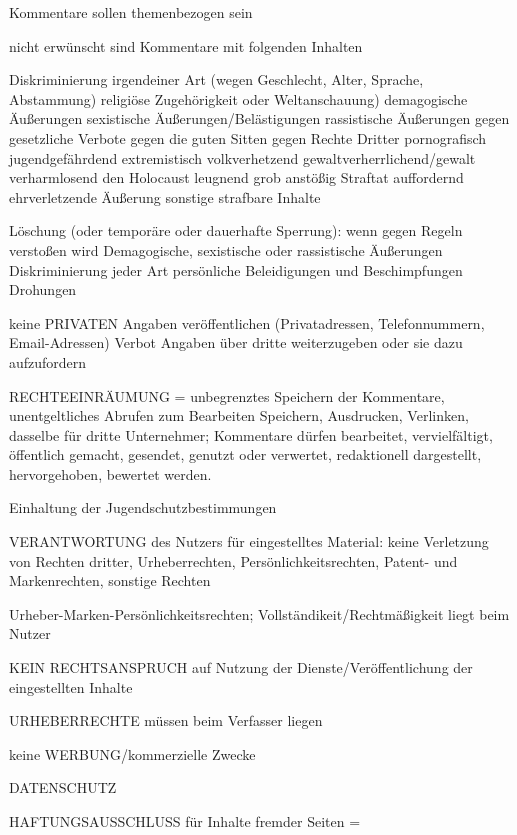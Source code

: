 Kommentare sollen themenbezogen sein

nicht erwünscht sind Kommentare mit folgenden Inhalten

Diskriminierung irgendeiner Art (wegen Geschlecht, Alter, Sprache, Abstammung) religiöse Zugehörigkeit oder Weltanschauung)
demagogische Äußerungen
sexistische Äußerungen/Belästigungen
rassistische Äußerungen 
gegen gesetzliche Verbote
gegen die guten Sitten 
gegen Rechte Dritter
pornografisch
jugendgefährdend
extremistisch
volkverhetzend
gewaltverherrlichend/gewalt verharmlosend
den Holocaust leugnend
grob anstößig
Straftat auffordernd 
ehrverletzende Äußerung
sonstige strafbare Inhalte


Löschung (oder temporäre oder dauerhafte Sperrung): wenn gegen Regeln verstoßen wird
Demagogische, sexistische oder rassistische Äußerungen
Diskriminierung jeder Art
persönliche Beleidigungen und Beschimpfungen
Drohungen

keine PRIVATEN Angaben veröffentlichen (Privatadressen, Telefonnummern, Email-Adressen)
Verbot Angaben über dritte weiterzugeben oder sie dazu aufzufordern

RECHTEEINRÄUMUNG =
unbegrenztes Speichern der Kommentare, unentgeltliches Abrufen zum Bearbeiten Speichern, Ausdrucken, Verlinken, dasselbe für dritte Unternehmer; Kommentare dürfen bearbeitet, vervielfältigt, öffentlich gemacht, gesendet, genutzt oder verwertet, redaktionell dargestellt, hervorgehoben, bewertet werden.


Einhaltung der Jugendschutzbestimmungen

VERANTWORTUNG des Nutzers für eingestelltes Material: 
keine Verletzung von Rechten dritter, Urheberrechten, Persönlichkeitsrechten, Patent- und Markenrechten, sonstige Rechten

Urheber-Marken-Persönlichkeitsrechten; Vollständikeit/Rechtmäßigkeit liegt beim Nutzer

KEIN RECHTSANSPRUCH auf Nutzung der Dienste/Veröffentlichung der eingestellten Inhalte

URHEBERRECHTE müssen beim Verfasser liegen

keine WERBUNG/kommerzielle Zwecke

DATENSCHUTZ

HAFTUNGSAUSSCHLUSS für Inhalte fremder Seiten =